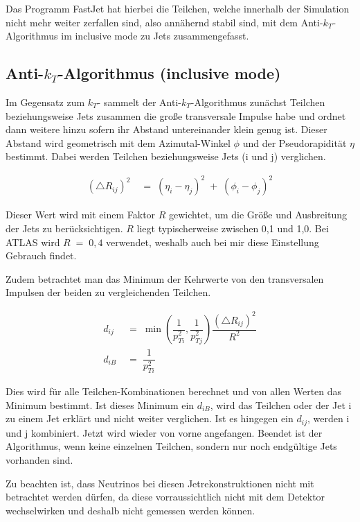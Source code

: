 \documentclass[
a4paper,                                %
twoside,                                %
BCOR1.4cm,                      %
ngerman,                                %
10pt,                           %
headings=normal,                %
headsepline,                    %
clearplainpage, %
final,                                  %
div=14,
parskip=full
]{scrbook}
\begin{document}
Das Programm FastJet hat hierbei die Teilchen, welche innerhalb der Simulation nicht mehr weiter zerfallen sind, also ann\"ahernd stabil sind, mit dem Anti-$ k_{T} $-Algorithmus im inclusive mode zu Jets zusammengefasst. \cite{fastjetmanual}

\subsection{Anti-$ k_{T} $-Algorithmus (inclusive mode)}

Im Gegensatz zum $ k_{T} $- sammelt der Anti-$ k_{T} $-Algorithmus zun\"achst Teilchen beziehungsweise Jets zusammen die gro\ss e transversale Impulse habe und ordnet dann weitere hinzu sofern ihr Abstand untereinander klein genug ist. Dieser Abstand wird geometrisch mit dem Azimutal-Winkel $ \phi $ und der Pseudorapidit\"at $ \eta $ bestimmt. Dabei werden Teilchen beziehungsweise Jets (i und j) verglichen.

\begin{align}
	\left(\bigtriangleup\!R_{ij}\right)^{2}
\;&=\;
	\left(\eta_{i} - \eta_{j}\right)^{2}\;+\;
	\left(\phi_{i} - \phi_{j}\right)^{2}
\label{deltaR}
\end{align}

Dieser Wert wird mit einem Faktor $ R $ gewichtet, um die Gr\"o\ss e und Ausbreitung der Jets zu ber\"ucksichtigen. $ R $ liegt typischerweise zwischen 0,1 und 1,0. Bei ATLAS wird $ R\;=\;0,4 $ verwendet, weshalb auch bei mir diese Einstellung Gebrauch findet.

Zudem betrachtet man das Minimum der Kehrwerte von den transversalen Impulsen der beiden zu vergleichenden Teilchen.

\begin{align*}
	d_{ij}
\;&=\;
	\min \left(\dfrac{1}{p_{Ti}^{2}}, \dfrac{1}{p_{Tj}^{2}}\right)
	\dfrac{\left(\bigtriangleup\!R_{ij}\right)^{2}}{R^{2}}
\\
	d_{iB}
\;&=\;
	\dfrac{1}{p_{Ti}^{2}}
\end{align*}

Dies wird f\"ur alle Teilchen-Kombinationen berechnet und von allen Werten das Minimum bestimmt. Ist dieses Minimum ein $ d_{iB} $, wird das Teilchen oder der Jet i zu einem Jet erkl\"art und nicht weiter verglichen. Ist es hingegen ein $ d_{ij} $, werden  i und j kombiniert. Jetzt wird wieder von vorne angefangen. Beendet ist der Algorithmus, wenn keine einzelnen Teilchen, sondern nur noch endg\"ultige Jets vorhanden sind. \cite{fastjetmanual}

Zu beachten ist, dass Neutrinos bei diesen Jetrekonstruktionen nicht mit betrachtet werden d\"urfen, da diese vorraussichtlich nicht mit dem Detektor wechselwirken und deshalb nicht gemessen werden k\"onnen.
\end{document}
